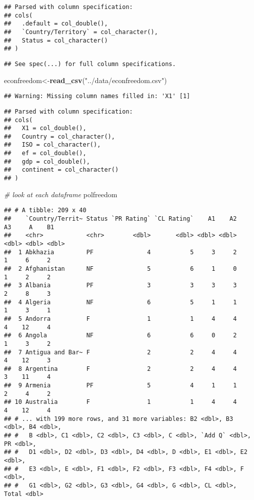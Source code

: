 \documentclass[
]{article}
\newenvironment{Shaded}{\begin{snugshade}}{\end{snugshade}}
\newcommand{\CommentTok}[1]{\textcolor[rgb]{0.56,0.35,0.01}{\textit{#1}}}
\newcommand{\KeywordTok}[1]{\textcolor[rgb]{0.13,0.29,0.53}{\textbf{#1}}}
\newcommand{\NormalTok}[1]{#1}
\newcommand{\StringTok}[1]{\textcolor[rgb]{0.31,0.60,0.02}{#1}}
\begin{document}
\begin{verbatim}
## Parsed with column specification:
## cols(
##   .default = col_double(),
##   `Country/Territory` = col_character(),
##   Status = col_character()
## )
\end{verbatim}

\begin{verbatim}
## See spec(...) for full column specifications.
\end{verbatim}

\begin{Shaded}
\begin{Highlighting}[]
\NormalTok{econfreedom<-}\KeywordTok{read_csv}\NormalTok{(}\StringTok{"../data/econfreedom.csv"}\NormalTok{)}
\end{Highlighting}
\end{Shaded}

\begin{verbatim}
## Warning: Missing column names filled in: 'X1' [1]
\end{verbatim}

\begin{verbatim}
## Parsed with column specification:
## cols(
##   X1 = col_double(),
##   Country = col_character(),
##   ISO = col_character(),
##   ef = col_double(),
##   gdp = col_double(),
##   continent = col_character()
## )
\end{verbatim}

\begin{Shaded}
\begin{Highlighting}[]
\CommentTok{# look at each dataframe}
\NormalTok{polfreedom}
\end{Highlighting}
\end{Shaded}

\begin{verbatim}
## # A tibble: 209 x 40
##    `Country/Territ~ Status `PR Rating` `CL Rating`    A1    A2    A3     A    B1
##    <chr>            <chr>        <dbl>       <dbl> <dbl> <dbl> <dbl> <dbl> <dbl>
##  1 Abkhazia         PF               4           5     3     2     1     6     2
##  2 Afghanistan      NF               5           6     1     0     1     2     2
##  3 Albania          PF               3           3     3     3     2     8     3
##  4 Algeria          NF               6           5     1     1     1     3     1
##  5 Andorra          F                1           1     4     4     4    12     4
##  6 Angola           NF               6           6     0     2     1     3     2
##  7 Antigua and Bar~ F                2           2     4     4     4    12     3
##  8 Argentina        F                2           2     4     4     3    11     4
##  9 Armenia          PF               5           4     1     1     2     4     2
## 10 Australia        F                1           1     4     4     4    12     4
## # ... with 199 more rows, and 31 more variables: B2 <dbl>, B3 <dbl>, B4 <dbl>,
## #   B <dbl>, C1 <dbl>, C2 <dbl>, C3 <dbl>, C <dbl>, `Add Q` <dbl>, PR <dbl>,
## #   D1 <dbl>, D2 <dbl>, D3 <dbl>, D4 <dbl>, D <dbl>, E1 <dbl>, E2 <dbl>,
## #   E3 <dbl>, E <dbl>, F1 <dbl>, F2 <dbl>, F3 <dbl>, F4 <dbl>, F <dbl>,
## #   G1 <dbl>, G2 <dbl>, G3 <dbl>, G4 <dbl>, G <dbl>, CL <dbl>, Total <dbl>
\end{verbatim}
\end{document}

